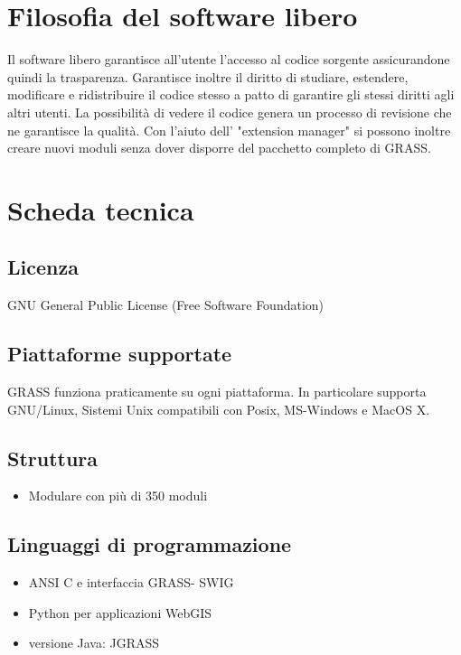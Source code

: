 \documentclass[notumble,a4paper,10pt,nofoldmark]{leaflet}
\begin{document}
\section{Filosofia del software libero}

Il software libero garantisce all'utente l'accesso al codice sorgente assicurandone quindi la trasparenza. Garantisce inoltre il diritto di studiare, estendere, modificare e ridistribuire il codice stesso a patto di garantire gli stessi diritti agli altri utenti. La possibilit\`a di vedere il codice genera un processo di revisione che ne garantisce la qualit\`a. Con l'aiuto dell' "extension manager" si possono inoltre creare nuovi moduli senza dover disporre del pacchetto completo di GRASS.

\section{Scheda tecnica}

\subsection{Licenza}

GNU General Public License (Free Software Foundation)

\subsection{Piattaforme supportate}

GRASS funziona praticamente su ogni piattaforma. In particolare supporta GNU/Linux, Sistemi Unix compatibili con Posix, MS-Windows e MacOS X.

\subsection{Struttura}

\begin{itemize}
\item Modulare con pi\`u di 350 moduli
\end{itemize}

\subsection{Linguaggi di programmazione}

\begin{itemize}
\item ANSI C e interfaccia GRASS- SWIG
\item Python per applicazioni WebGIS
\item versione Java: JGRASS
\end{itemize}
\end{document}
